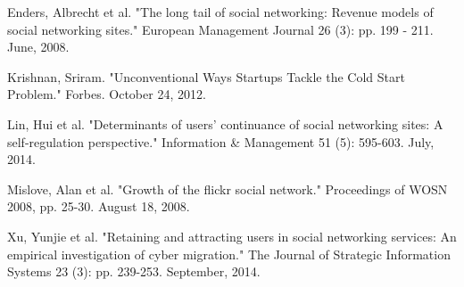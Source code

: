 \documentclass[class=book, crop=false]{standalone}
\begin{document}
Enders, Albrecht et al. "The long tail of social networking: Revenue models of social networking sites." European Management Journal 26 (3): pp. 199 - 211. June, 2008.

Krishnan, Sriram. "Unconventional Ways Startups Tackle the Cold Start Problem." Forbes. October 24, 2012.

Lin, Hui et al. "Determinants of users' continuance of social networking sites: A self-regulation perspective." Information \& Management 51 (5): 595-603. July, 2014.

Mislove, Alan et al. "Growth of the flickr social network." Proceedings of WOSN 2008, pp. 25-30. August 18, 2008.

Xu, Yunjie et al. "Retaining and attracting users in social networking services: An empirical investigation of cyber migration." The Journal of Strategic Information Systems 23 (3): pp. 239-253. September, 2014.
\end{document}

